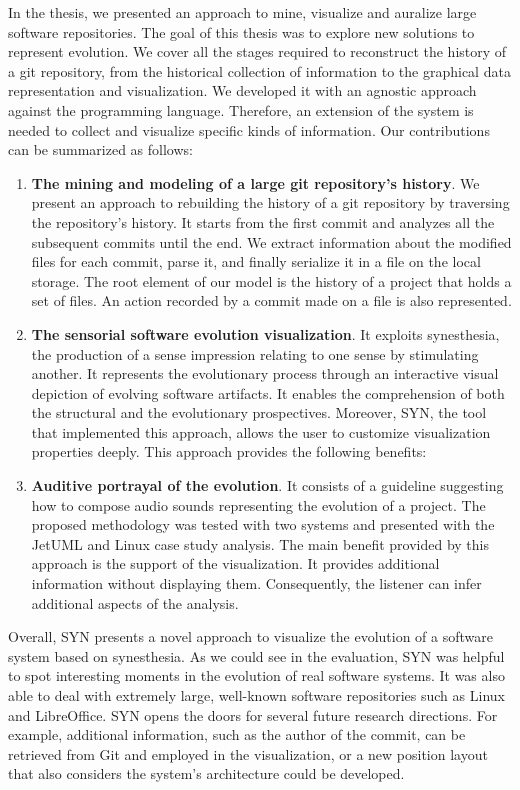 \documentclass[11pt,twoside,english,singlespacing,headsepline,consistentlayout]{auxiliary/si-msc-thesis}
\begin{document}
In the thesis, we presented an approach to mine, visualize and auralize large software repositories. The goal of this thesis was to explore new solutions to represent evolution. We cover all the stages required to reconstruct the history of a git repository, from the historical collection of information to the graphical data representation and visualization. We developed it with an agnostic approach against the programming language. Therefore, an extension of the system is needed to collect and visualize specific kinds of information. Our contributions can be summarized as follows:
\begin{enumerate}
    \item \textbf{The mining and modeling of a large git repository's history}. We present an approach to rebuilding the history of a git repository by traversing the repository's history. It starts from the first commit and analyzes all the subsequent commits until the end.
    We extract information about the modified files for each commit, parse it, and finally serialize it in a file on the local storage. The root element of our model is the history of a project that holds a set of files. An action recorded by a commit made on a file is also represented.
    \item \textbf{The sensorial software evolution visualization}. It exploits synesthesia, the production of a sense impression relating to one sense by stimulating another. It represents the evolutionary process through an interactive visual depiction of evolving software artifacts. It enables the comprehension of both the structural and the evolutionary prospectives. Moreover, SYN, the tool that implemented this approach, allows the user to customize visualization properties deeply. This approach provides the following benefits:
    \item \textbf{Auditive portrayal of the evolution}. It consists of a guideline suggesting how to compose audio sounds representing the evolution of a project. The proposed methodology was tested with two systems and presented with the JetUML and Linux case study analysis. The main benefit provided by this approach is the support of the visualization. It provides additional information without displaying them. Consequently, the listener can infer additional aspects of the analysis.
\end{enumerate}  

Overall, SYN presents a novel approach to visualize the evolution of a software system based on synesthesia. As we could see in the evaluation, SYN was helpful to spot interesting moments in the evolution of real software systems. It was also able to deal with extremely large, well-known software repositories such as Linux and LibreOffice. SYN opens the doors for several future research directions. For example, additional information, such as the author of the commit, can be retrieved from Git and employed in the visualization, or a new position layout that also considers the system's architecture could be developed. 

\newpage


\end{document}
